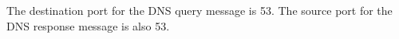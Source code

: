 The destination port for the DNS query message is 53. The source port for the DNS response message is also 53.